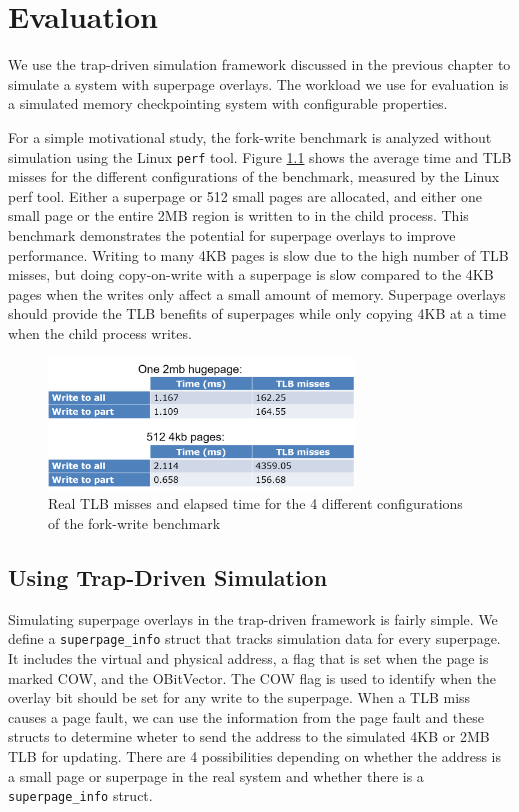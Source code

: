 \chapter{Evaluation}

We use the trap-driven simulation framework discussed in the previous chapter to simulate a system with superpage overlays. The workload we use for evaluation is a simulated memory checkpointing system with configurable properties.

For a simple motivational study, the fork-write benchmark is analyzed without simulation using the Linux \verb|perf| tool. Figure \ref{fig:tables} shows the average time and TLB misses for the different configurations of the benchmark, measured by the Linux perf tool. Either a superpage or 512 small pages are allocated, and either one small page or the entire 2MB region is written to in the child process. This benchmark demonstrates the potential for superpage overlays to improve performance. Writing to many 4KB pages is slow due to the high number of TLB misses, but doing copy-on-write with a superpage is slow compared to the 4KB pages when the writes only affect a small amount of memory. Superpage overlays should provide the TLB benefits of superpages while only copying 4KB at a time when the child process writes.
\begin{figure}
    \centering
    \includegraphics[width=3.2in]{Figures/Table1}
    \caption{Real TLB misses and elapsed time for the 4 different configurations of the fork-write benchmark}
    \label{fig:tables}
\end{figure}

\section{Using Trap-Driven Simulation}

Simulating superpage overlays in the trap-driven framework is fairly simple. We define a \verb|superpage_info| struct that tracks simulation data for every superpage. It includes the virtual and physical address, a flag that is set when the page is marked COW, and the OBitVector. The COW flag is used to identify when the overlay bit should be set for any write to the superpage. When a TLB miss causes a page fault, we can use the information from the page fault and these structs to determine wheter to send the address to the simulated 4KB or 2MB TLB for updating. There are 4 possibilities depending on whether the address is a small page or superpage in the real system and whether there is a \verb|superpage_info| struct.

